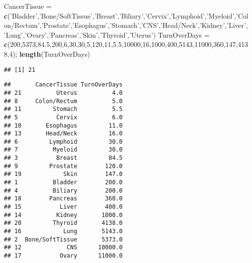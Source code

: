 \documentclass[
]{article}
\newenvironment{Shaded}{\begin{snugshade}}{\end{snugshade}}
\newcommand{\DecValTok}[1]{\textcolor[rgb]{0.00,0.00,0.81}{#1}}
\newcommand{\FloatTok}[1]{\textcolor[rgb]{0.00,0.00,0.81}{#1}}
\newcommand{\KeywordTok}[1]{\textcolor[rgb]{0.13,0.29,0.53}{\textbf{#1}}}
\newcommand{\NormalTok}[1]{#1}
\newcommand{\OperatorTok}[1]{\textcolor[rgb]{0.81,0.36,0.00}{\textbf{#1}}}
\newcommand{\StringTok}[1]{\textcolor[rgb]{0.31,0.60,0.02}{#1}}
\begin{document}
\begin{Shaded}
\begin{Highlighting}[]
\NormalTok{CancerTissue =}\StringTok{ }\KeywordTok{c}\NormalTok{(}\StringTok{'Bladder'}\NormalTok{,}\StringTok{'Bone/SoftTissue'}\NormalTok{,}\StringTok{'Breast'}\NormalTok{,}\StringTok{'Biliary'}\NormalTok{,}\StringTok{'Cervix'}\NormalTok{,}\StringTok{'Lymphoid'}\NormalTok{,}\StringTok{'Myeloid'}\NormalTok{,}\StringTok{'Colon/Rectum'}\NormalTok{,}\StringTok{'Prostate'}\NormalTok{,}\StringTok{'Esophagus'}\NormalTok{,}\StringTok{'Stomach'}\NormalTok{,}\StringTok{'CNS'}\NormalTok{,}\StringTok{'Head/Neck'}\NormalTok{,}\StringTok{'Kidney'}\NormalTok{,}\StringTok{'Liver'}\NormalTok{,}\StringTok{'Lung'}\NormalTok{,}\StringTok{'Ovary'}\NormalTok{,}\StringTok{'Pancreas'}\NormalTok{,}\StringTok{'Skin'}\NormalTok{,}\StringTok{'Thyroid'}\NormalTok{,}\StringTok{'Uterus'}\NormalTok{)  }
\NormalTok{TurnOverDays =}\StringTok{ }\KeywordTok{c}\NormalTok{(}\DecValTok{200}\NormalTok{,}\DecValTok{5373}\NormalTok{,}\FloatTok{84.5}\NormalTok{,}\DecValTok{200}\NormalTok{,}\DecValTok{6}\NormalTok{,}\DecValTok{30}\NormalTok{,}\DecValTok{30}\NormalTok{,}\DecValTok{5}\NormalTok{,}\DecValTok{120}\NormalTok{,}\DecValTok{11}\NormalTok{,}\FloatTok{5.5}\NormalTok{,}\DecValTok{10000}\NormalTok{,}\DecValTok{16}\NormalTok{,}\DecValTok{1000}\NormalTok{,}\DecValTok{400}\NormalTok{,}\DecValTok{5143}\NormalTok{,}\DecValTok{11000}\NormalTok{,}\DecValTok{360}\NormalTok{,}\DecValTok{147}\NormalTok{,}\DecValTok{4138}\NormalTok{,}\DecValTok{4}\NormalTok{); }\KeywordTok{length}\NormalTok{(TurnOverDays)}
\end{Highlighting}
\end{Shaded}

\begin{verbatim}
## [1] 21
\end{verbatim}

\begin{Shaded}
\end{Shaded}

\begin{verbatim}
##       CancerTissue TurnOverDays
## 21          Uterus          4.0
## 8     Colon/Rectum          5.0
## 11         Stomach          5.5
## 5           Cervix          6.0
## 10       Esophagus         11.0
## 13       Head/Neck         16.0
## 6         Lymphoid         30.0
## 7          Myeloid         30.0
## 3           Breast         84.5
## 9         Prostate        120.0
## 19            Skin        147.0
## 1          Bladder        200.0
## 4          Biliary        200.0
## 18        Pancreas        360.0
## 15           Liver        400.0
## 14          Kidney       1000.0
## 20         Thyroid       4138.0
## 16            Lung       5143.0
## 2  Bone/SoftTissue       5373.0
## 12             CNS      10000.0
## 17           Ovary      11000.0
\end{verbatim}
\end{document}
